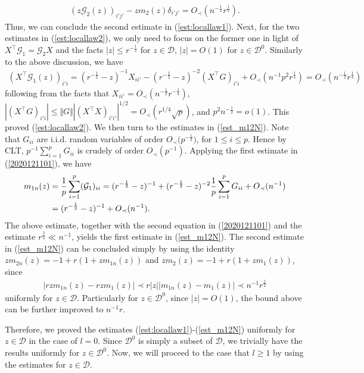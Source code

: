 \documentclass[12pt]{article}
\numberwithin{equation}{section}
\theoremstyle{remark}
\newcommand{\1}{{\rm 1}\kern-0.24em{\rm I}}
\begin{document}
\begin{appendices}
\begin{align*}
(z\mathcal{G}_2(z) )_{i'j'}- zm_2(z)\delta_{i'j'}= O_\prec(n^{-\frac 12} r^{\frac12}).
\end{align*}
Thus, we can conclude the second estimate in (\ref{est:locallaw1}).  Next,  for the two estimates in (\ref{est:locallaw2}), we only need to focus on the former one in light of ${X}^{\top} \mathcal{G}_1= \mathcal{G}_2 {X}$ and the facts $|z|\leq r^{-\frac 12}$ for $z\in \mathcal{D}$,  $|z|=O(1)$ for $z\in \mathcal{D}^0$. Similarly to the above discussion, we have 
\begin{align} \label{20201216008}
( {X}^{\top} \mathcal{G}_1(z))_{i'i} =  (r^{-\frac 12} - z)^{-1} X_{ii'} - (r^{-\frac 12} - z)^{-2} ({X}^{\top} G)_{i'i} + O_\prec(n^{-1}p^2r^{\frac 14}) = O_\prec(n^{-\frac 12} r^{\frac 14})
\end{align} 
following from the facts that $X_{ii'} = O_\prec(n^{-\frac 12} r^{-\frac 14})$, $|({X}^{\top} G)_{i'i}|\leq \Vert G\Vert  |({X}^{\top} {X}) _{i'i'}|^{1/2}= O_\prec(r^{1/4}\sqrt p)$, and $p^{2}n^{-\frac 12} = o(1)$. This proved (\ref{est:locallaw2}). We then turn to the estimates in (\ref{est_m12N}). Note that $ G_{ii} $ are i.i.d. random variables of order $O_\prec\big(p^{-\frac 12}\big)$, for $1\leq i \leq p$. Hence by CLT, $p^{-1}\sum_{i=1}^p G_{ii} $ is crudely of order $O_\prec(p^{-1})$. Applying the first estimate in (\ref{2020121101}), we  have 
\begin{align*}
m_{1n}(z) &= \frac{1}{p} \sum_{i=1}^p (\mathcal{G}_1)_{ii} = (r^{-\frac 12} - z)^{-1}+ (r^{-\frac 12} - z)^{-2} \frac{1}{p} \sum_{i=1}^p G_{ii}  + O_\prec(n^{-1}) \notag\\
&=(r^{-\frac 12} - z)^{-1} + O_\prec(n^{-1}).
\end{align*}
 The above estimate,
together with the second equation in  (\ref{2020121101}) and the estimate $r^{\frac 32}\ll n^{-1}$, yields the first estimate in  (\ref{est_m12N}). The second estimate in  (\ref{est_m12N}) can be concluded simply by using  the identity $zm_{2n}(z)= -1+ r(1+ zm_{1n}(z))$ and $zm_{2}(z)= -1+ r(1+ zm_{1}(z))$, since 
\begin{align*}
|rzm_{1n}(z)- rz m_{1}(z)|\prec r |z| |m_{1n}(z) - m_1(z)|\prec n^{-1}r^{\frac 12}
\end{align*}
 uniformly for $z\in \mathcal{D}$. Particularly for $z\in \mathcal{D}^0$, since $|z|= O(1)$, the bound above can be further improved to $n^{-1}r$.
 
 Therefore, we proved the estimates (\ref{est:locallaw1})-(\ref{est_m12N}) uniformly for   $z\in \mathcal{D}$ in the case of $l=0$. Since $\mathcal{D}^0$ is simply a subset of 
$\mathcal{D}$, we trivially have the results uniformly for   $z\in \mathcal{D}^0$. Now, we will proceed to the case that $l\geq 1$ by using the estimates for   $z\in \mathcal{D}$.


\end{appendices}
\end{document}
